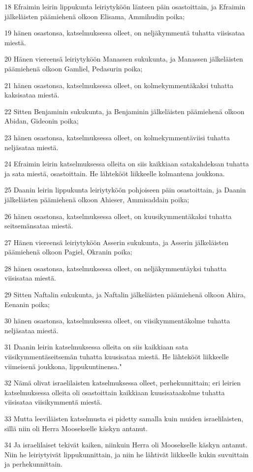 \par 18 Efraimin leirin lippukunta leiriytyköön länteen päin osastoittain, ja Efraimin jälkeläisten päämiehenä olkoon Elisama, Ammihudin poika;
\par 19 hänen osastonsa, katselmuksessa olleet, on neljäkymmentä tuhatta viisisataa miestä.
\par 20 Hänen viereensä leiriytyköön Manassen sukukunta, ja Manassen jälkeläisten päämiehenä olkoon Gamliel, Pedasurin poika;
\par 21 hänen osastonsa, katselmuksessa olleet, on kolmekymmentäkaksi tuhatta kaksisataa miestä.
\par 22 Sitten Benjaminin sukukunta, ja Benjaminin jälkeläisten päämiehenä olkoon Abidan, Gideonin poika;
\par 23 hänen osastonsa, katselmuksessa olleet, on kolmekymmentäviisi tuhatta neljäsataa miestä.
\par 24 Efraimin leirin katselmuksessa olleita on siis kaikkiaan satakahdeksan tuhatta ja sata miestä, osastoittain. He lähtekööt liikkeelle kolmantena joukkona.
\par 25 Daanin leirin lippukunta leiriytyköön pohjoiseen päin osastoittain, ja Daanin jälkeläisten päämiehenä olkoon Ahieser, Ammisaddain poika;
\par 26 hänen osastonsa, katselmuksessa olleet, on kuusikymmentäkaksi tuhatta seitsemänsataa miestä.
\par 27 Hänen viereensä leiriytyköön Asserin sukukunta, ja Asserin jälkeläisten päämiehenä olkoon Pagiel, Okranin poika;
\par 28 hänen osastonsa, katselmuksessa olleet, on neljäkymmentäyksi tuhatta viisisataa miestä.
\par 29 Sitten Naftalin sukukunta, ja Naftalin jälkeläisten päämiehenä olkoon Ahira, Eenanin poika;
\par 30 hänen osastonsa, katselmuksessa olleet, on viisikymmentäkolme tuhatta neljäsataa miestä.
\par 31 Daanin leirin katselmuksessa olleita on siis kaikkiaan sata viisikymmentäseitsemän tuhatta kuusisataa miestä. He lähtekööt liikkeelle viimeisenä joukkona, lippukuntinensa."
\par 32 Nämä olivat israelilaisten katselmuksessa olleet, perhekunnittain; eri leirien katselmuksessa olleita oli osastoittain kaikkiaan kuusisataakolme tuhatta viisisataa viisikymmentä miestä.
\par 33 Mutta leeviläisten katselmusta ei pidetty samalla kuin muiden israelilaisten, sillä niin oli Herra Moosekselle käskyn antanut.
\par 34 Ja israelilaiset tekivät kaiken, niinkuin Herra oli Moosekselle käskyn antanut. Niin he leiriytyivät lippukunnittain, ja niin he lähtivät liikkeelle kukin suvuittain ja perhekunnittain.

